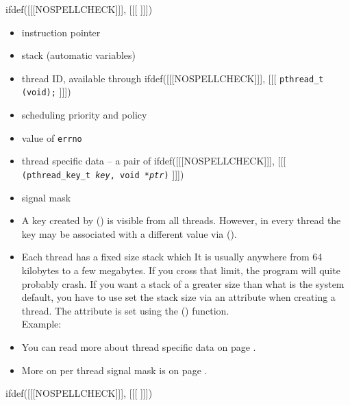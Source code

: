 
ifdef([[[NOSPELLCHECK]]], [[[
\label{THREAD_ATTRS}
]]])

\begin{slide}
\begin{itemize}
\item instruction pointer
\item stack (automatic variables)
\item thread ID, available through
ifdef([[[NOSPELLCHECK]]], [[[
\texttt{pthread\_t (void);}
]]])
\item scheduling priority and policy
\item value of \texttt{errno}
\item thread specific data -- a pair of
ifdef([[[NOSPELLCHECK]]], [[[
\texttt{(pthread\_key\_t \emph{key}, void *\emph{ptr})}
]]])
\item signal mask
\end{itemize}
\end{slide}

\begin{itemize}
\item A key created by () is visible from all
threads. However, in every thread the key may be associated with a different
value via ().
\item Each thread has a fixed size stack which   It is usually anywhere from 64 kilobytes to a few megabytes.  If you
cross that limit, the program will quite probably crash.  If you want a stack of
a greater size than what is the system default, you have to use
set the stack size via an attribute when creating a thread.
The attribute is set using the () function.
\\
Example: 
\item You can read more about thread specific data on page
\pageref{THREAD_SPECIFIC_DATA}.
\item More on per thread signal mask is on page \pageref{PTHREADSIGMASK}.
\end{itemize}


ifdef([[[NOSPELLCHECK]]], [[[
]]])

